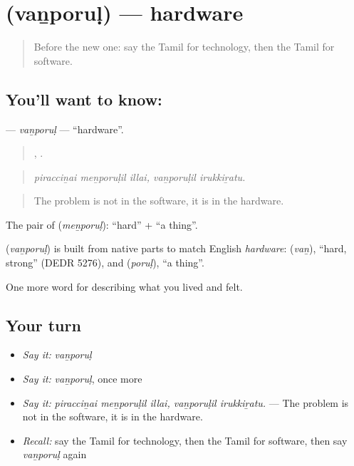 \section[\texorpdfstring{\ta{வன்பொருள்} (vaṉporuḷ)}{வன்பொருள் (vaṉporuḷ)}]{ (vaṉporuḷ) — hardware}

\label{lesson:TA-C515-vanporul}



\begin{quote}
Before the new one: say the Tamil for technology, then the Tamil for software.
\end{quote}

\subsection*{You'll want to know: }
\textbf{} — \emph{vaṉporuḷ} — \textquotedblleft{}hardware\textquotedblright{}.

\begin{quote}
  ,  .
\end{quote}

\begin{quote}
\emph{piracciṉai meṉporuḷil illai, vaṉporuḷil irukkiṟatu.}
\end{quote}

\begin{quote}
The problem is not in the software, it is in the hardware.
\end{quote}

The pair of  (\emph{meṉporuḷ}):  \textquotedblleft{}hard\textquotedblright{} +  \textquotedblleft{}a thing\textquotedblright{}.

\begin{cousinweb}
\textbf{} (\emph{vaṉporuḷ}) is built from native parts to match English \emph{hardware}:  (\emph{vaṉ}), \textquotedblleft{}hard, strong\textquotedblright{} (DEDR 5276), and  (\emph{poruḷ}), \textquotedblleft{}a thing\textquotedblright{}.
\end{cousinweb}

\begin{grammarlens}[title={What you've built}]
One more word for describing what you lived and felt.
\end{grammarlens}

\subsection*{Your turn}
\begin{itemize}
\raggedright
  \item \emph{Say it:} \emph{vaṉporuḷ}
  \item \emph{Say it:} \emph{vaṉporuḷ}, once more
  \item \emph{Say it:} \emph{piracciṉai meṉporuḷil illai, vaṉporuḷil irukkiṟatu.} — The problem is not in the software, it is in the hardware.
  \item \emph{Recall:} say the Tamil for technology, then the Tamil for software, then say \emph{vaṉporuḷ} again
\end{itemize}

